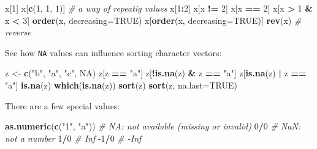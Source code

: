 \documentclass[12pt,]{book}
\newenvironment{Shaded}{\begin{snugshade}}{\end{snugshade}}
\newcommand{\CommentTok}[1]{\textcolor[rgb]{0.56,0.35,0.01}{\textit{#1}}}
\newcommand{\DataTypeTok}[1]{\textcolor[rgb]{0.13,0.29,0.53}{#1}}
\newcommand{\DecValTok}[1]{\textcolor[rgb]{0.00,0.00,0.81}{#1}}
\newcommand{\KeywordTok}[1]{\textcolor[rgb]{0.13,0.29,0.53}{\textbf{#1}}}
\newcommand{\NormalTok}[1]{#1}
\newcommand{\OperatorTok}[1]{\textcolor[rgb]{0.81,0.36,0.00}{\textbf{#1}}}
\newcommand{\OtherTok}[1]{\textcolor[rgb]{0.56,0.35,0.01}{#1}}
\newcommand{\StringTok}[1]{\textcolor[rgb]{0.31,0.60,0.02}{#1}}
\begin{document}
\begin{Shaded}
\begin{Highlighting}[]
\NormalTok{x[}\DecValTok{1}\NormalTok{]}
\NormalTok{x[}\KeywordTok{c}\NormalTok{(}\DecValTok{1}\NormalTok{, }\DecValTok{1}\NormalTok{, }\DecValTok{1}\NormalTok{)] }\CommentTok{# a way of repeatig values}
\NormalTok{x[}\DecValTok{1}\OperatorTok{:}\DecValTok{2}\NormalTok{]}
\NormalTok{x[x }\OperatorTok{!=}\StringTok{ }\DecValTok{2}\NormalTok{]}
\NormalTok{x[x }\OperatorTok{==}\StringTok{ }\DecValTok{2}\NormalTok{]}
\NormalTok{x[x }\OperatorTok{>}\StringTok{ }\DecValTok{1} \OperatorTok{&}\StringTok{ }\NormalTok{x }\OperatorTok{<}\StringTok{ }\DecValTok{3}\NormalTok{]}
\KeywordTok{order}\NormalTok{(x, }\DataTypeTok{decreasing=}\OtherTok{TRUE}\NormalTok{)}
\NormalTok{x[}\KeywordTok{order}\NormalTok{(x, }\DataTypeTok{decreasing=}\OtherTok{TRUE}\NormalTok{)]}
\KeywordTok{rev}\NormalTok{(x) }\CommentTok{# reverse}
\end{Highlighting}
\end{Shaded}

See how \texttt{NA} values can influence
sorting character vectors:

\begin{Shaded}
\begin{Highlighting}[]
\NormalTok{z <-}\StringTok{ }\KeywordTok{c}\NormalTok{(}\StringTok{"b"}\NormalTok{, }\StringTok{"a"}\NormalTok{, }\StringTok{"c"}\NormalTok{, }\OtherTok{NA}\NormalTok{)}
\NormalTok{z[z }\OperatorTok{==}\StringTok{ "a"}\NormalTok{]}
\NormalTok{z[}\OperatorTok{!}\KeywordTok{is.na}\NormalTok{(z) }\OperatorTok{&}\StringTok{ }\NormalTok{z }\OperatorTok{==}\StringTok{ "a"}\NormalTok{]}
\NormalTok{z[}\KeywordTok{is.na}\NormalTok{(z) }\OperatorTok{|}\StringTok{ }\NormalTok{z }\OperatorTok{==}\StringTok{ "a"}\NormalTok{]}
\KeywordTok{is.na}\NormalTok{(z)}
\KeywordTok{which}\NormalTok{(}\KeywordTok{is.na}\NormalTok{(z))}
\KeywordTok{sort}\NormalTok{(z)}
\KeywordTok{sort}\NormalTok{(z, }\DataTypeTok{na.last=}\OtherTok{TRUE}\NormalTok{)}
\end{Highlighting}
\end{Shaded}

There are a few special values:

\begin{Shaded}
\begin{Highlighting}[]
\KeywordTok{as.numeric}\NormalTok{(}\KeywordTok{c}\NormalTok{(}\StringTok{"1"}\NormalTok{, }\StringTok{"a"}\NormalTok{)) }\CommentTok{# NA: not available (missing or invalid)}
\DecValTok{0}\OperatorTok{/}\DecValTok{0} \CommentTok{# NaN: not a number}
\DecValTok{1}\OperatorTok{/}\DecValTok{0} \CommentTok{# Inf}
\DecValTok{-1}\OperatorTok{/}\DecValTok{0} \CommentTok{# -Inf}
\end{Highlighting}
\end{Shaded}
\end{document}
